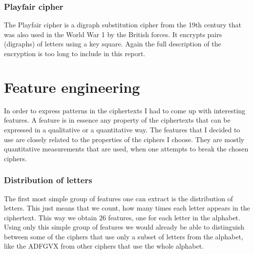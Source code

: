 \documentclass[a4paper]{article}
\begin{document}
\subsubsection*{Playfair cipher}
The Playfair cipher is a digraph substitution cipher from the 19th century that was also used in the World War 1 by the British forces. It encrypts pairs (digraphs) of letters using a key square. Again the full description of the encryption is too long to include in this report.



\section*{Feature engineering}
In order to express patterns in the ciphertexts I had to come up with interesting features. A feature is in essence any property of the ciphertexts that can be expressed in a qualitative or a quantitative way. The features that I decided to use are closely related to the properties of the ciphers I choose. They are mostly quantitative measurements that are used, when one attempts to break the chosen ciphers.

\subsubsection*{Distribution of letters}
The first most simple group of features one can extract is the distribution of letters. This just means that we count, how many times each letter appears in the ciphertext. This way we obtain $26$ features, one for each letter in the alphabet. Using only this simple group of features we would already be able to distinguish between some of the ciphers that use only a subset of letters from the alphabet, like the ADFGVX from other ciphers that use the whole alphabet.
\end{document}
